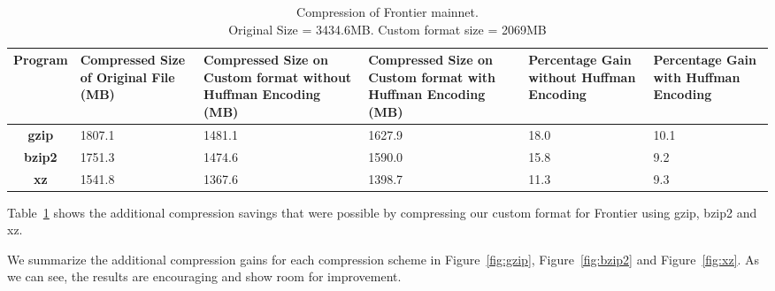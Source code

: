 \begin{table}
	\centering
\captionsetup{justification=centering}
\begin{tabular}{ >{\bfseries}c| p{2cm} | p{2cm} | p{2cm} | p{1.5cm} | p{1.5cm} }
	Program & {Compressed Size of Original File (MB)} & {Compressed Size on Custom format without Huffman Encoding (MB)} & {Compressed Size on Custom format with Huffman Encoding (MB)} &Percentage Gain without Huffman Encoding & Percentage Gain with Huffman Encoding\\
  \hline
  gzip  & 1807.1 & 1481.1 & 1627.9 & 18.0 & 10.1 \\
  bzip2 & 1751.3 & 1474.6 & 1590.0 & 15.8 & 9.2 \\
  xz   & 1541.8 & 1367.6 & 1398.7 & 11.3  & 9.3 \\
\end{tabular}
\caption{Compression of Frontier mainnet. \\ Original Size = 3434.6MB. Custom format size = 2069MB}
\label{tab:compfrontier}
\end{table}
Table~\ref{tab:compfrontier} 
shows the additional compression savings that were possible by compressing 
our custom format for Frontier  using gzip, bzip2 and xz.


We summarize the additional compression gains for each compression scheme in Figure~\ref{fig:gzip}, Figure~\ref{fig:bzip2} and Figure~\ref{fig:xz}. 
As we can see, the results are encouraging and show room for improvement.

